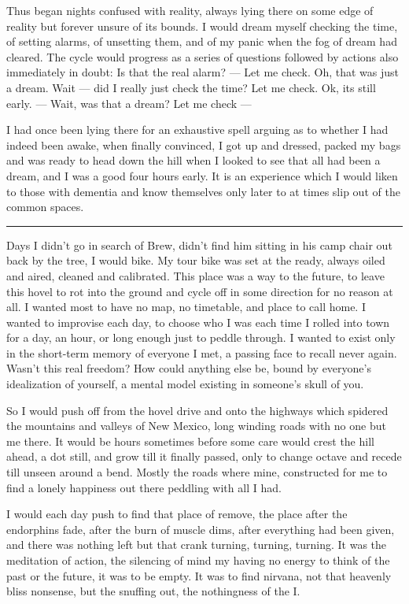 \documentclass[ebook, 10pt, openright, onecolumn]{memoir}
\newcommand*\starbreak{\fancybreak*{\Large{* * *}}}
\begin{document}
Thus began nights confused with reality, always lying there on some edge of
reality but forever unsure of its bounds.  I would dream myself checking the
time, of setting alarms, of unsetting them, and of my panic when the fog of
dream had cleared.  The cycle would progress as a series of questions followed
by actions also immediately in doubt:  Is that the real alarm? --- Let me
check. Oh, that was just a dream.  Wait --- did I really just check the time?
Let me check.  Ok, its still early. --- Wait, was that a dream?  Let me check
---

I had once been lying there for an exhaustive spell arguing as to whether I had
indeed been awake, when finally convinced, I got up and dressed, packed my bags
and was ready to head down the hill when I looked to see that all had been a
dream, and I was a good four hours early.  It is an experience which I would
liken to those with dementia and know themselves only later to at times slip out
of the common spaces.

\starbreak

Days I didn't go in search of Brew, didn't find him sitting in his
camp chair out back by the tree, I would bike.  My tour bike was set at the
ready, always oiled and aired, cleaned and calibrated.  This place was a way to
the future, to leave this hovel to rot into the ground and cycle off in some
direction for no reason at all.  I wanted most to have no map, no timetable, and
place to call home.  I wanted to improvise each day, to choose who I was each
time I rolled into town for a day, an hour, or long enough just to peddle
through.  I wanted to exist only in the short-term memory of everyone I met, a
passing face to recall never again.  Wasn't this real freedom?  How could
anything else be, bound by everyone's idealization of yourself, a mental model
existing in someone's skull of you.

So I would push off from the hovel drive and onto the highways which spidered
the mountains and valleys of New Mexico, long winding roads with no one but me
there.  It would be hours sometimes before some care would crest the hill ahead,
a dot still, and grow till it finally passed, only to change octave and recede
till unseen around a bend.  Mostly the roads where mine, constructed for me to
find a lonely happiness out there peddling with all I had.

I would each day push to find that place of remove, the place after the
endorphins fade, after the burn of muscle dims, after everything had been given,
and there was nothing left but that crank turning, turning, turning.  It was the
meditation of action, the silencing of mind my having no energy to think of the
past or the future, it was to be empty.  It was to find nirvana, not that
heavenly bliss nonsense, but the snuffing out, the nothingness of the I.  
\end{document}
